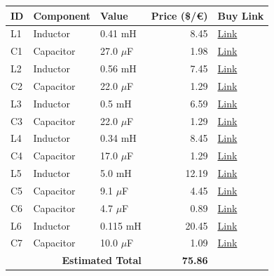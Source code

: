 \begin{table}[H]
    \centering
    \renewcommand{\arraystretch}{1.5}
    \begin{tabular}{@{}lllrl@{}}
        \toprule
        \textbf{ID} & \textbf{Component} & \textbf{Value} & \textbf{Price (\$/€)} & \textbf{Buy Link} \\
        \midrule
        L1 & Inductor & 0.41 mH & 8.45 & \href{https://www.soundimports.eu/en/jantzen-audio-000-1303.html}{Link} \\
        C1 & Capacitor & 27.0 $\mu$F & 1.98 & \href{https://www.soundimports.eu/en/jantzen-audio-001-6150.html}{Link} \\
        L2 & Inductor & 0.56 mH & 7.45 & \href{https://www.soundimports.eu/en/jantzen-audio-000-2377.html}{Link} \\
        C2 & Capacitor & 22.0 $\mu$F & 1.29 & \href{https://www.parts-express.com/22uF-100V-Non-Polarized-Capacitor-027-348}{Link} \\
        L3 & Inductor & 0.5 mH & 6.59 & \href{https://www.parts-express.com/Dayton-Audio-LW18-50-0.50mH-18-AWG-Perfect-Layer-Inductor-257-816}{Link} \\
        C3 & Capacitor & 22.0 $\mu$F & 1.29 & \href{https://www.parts-express.com/22uF-100V-Non-Polarized-Capacitor-027-348}{Link} \\
        L4 & Inductor & 0.34 mH & 8.45 & \href{https://www.soundimports.eu/en/jantzen-audio-000-0832.html}{Link} \\
        C4 & Capacitor & 17.0 $\mu$F & 1.29 & \href{https://www.parts-express.com/17uF-100V-Non-Polarized-Capacitor-027-346}{Link} \\
        L5 & Inductor & 5.0 mH & 12.19 & \href{https://www.parts-express.com/Dayton-Audio-IC185-5.0mH-18-AWG-Laminated-Iron-Core-Inductor-257-668}{Link} \\
        C5 & Capacitor & 9.1 $\mu$F & 4.45 & \href{https://www.soundimports.eu/en/jantzen-audio-001-0263.html}{Link} \\
        C6 & Capacitor & 4.7 $\mu$F & 0.89 & \href{https://www.parts-express.com/4.7uF-100V-Non-Polarized-Capacitor-027-332}{Link} \\
        L6 & Inductor & 0.115 mH & 20.45 & \href{https://www.soundimports.eu/en/jantzen-audio-000-7623.html}{Link} \\
        C7 & Capacitor & 10.0 $\mu$F & 1.09 & \href{https://www.parts-express.com/10uF-100V-Non-Polarized-Capacitor-027-340}{Link} \\
        \midrule
        \multicolumn{3}{r}{\textbf{Estimated Total}} & \textbf{75.86} & \\
        \bottomrule
    \end{tabular}
\end{table}

